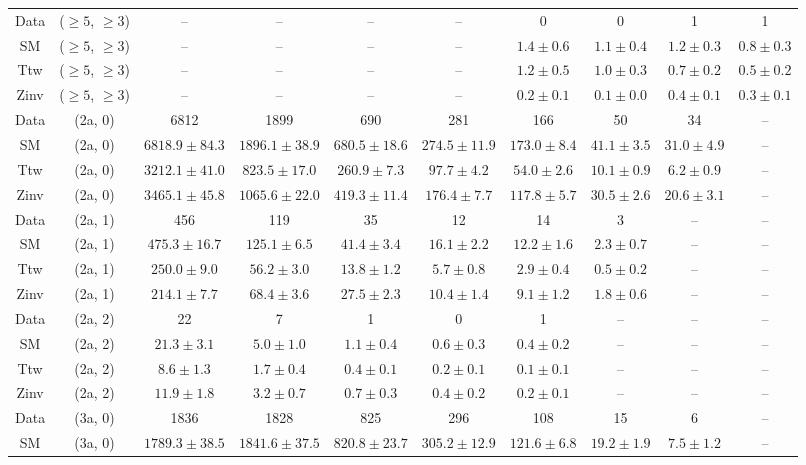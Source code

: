 \begin{table}[h!]
{\begin{tabular}{cccccccccc}
	Data & ($\ge5$, $\ge3$) & -- & -- & -- & -- & 0 & 0 & 1 & 1 \\[0.5ex] 
	SM & ($\ge5$, $\ge3$) & -- & -- & -- & -- & $1.4\pm 0.6$ & $1.1\pm 0.4$ & $1.2\pm 0.3$ & $0.8\pm 0.3$ \\[0.5ex] 
	Ttw & ($\ge5$, $\ge3$) & -- & -- & -- & -- & $1.2\pm 0.5$ & $1.0\pm 0.3$ & $0.7\pm 0.2$ & $0.5\pm 0.2$ \\[0.5ex] 
	Zinv & ($\ge5$, $\ge3$) & -- & -- & -- & -- & $0.2\pm 0.1$ & $0.1\pm 0.0$ & $0.4\pm 0.1$ & $0.3\pm 0.1$ \\[0.5ex] 
	Data & (2a, 0) & 6812 & 1899 & 690 & 281 & 166 & 50 & 34 & -- \\[0.5ex] 
	SM & (2a, 0) & $6818.9\pm 84.3$ & $1896.1\pm 38.9$ & $680.5\pm 18.6$ & $274.5\pm 11.9$ & $173.0\pm 8.4$ & $41.1\pm 3.5$ & $31.0\pm 4.9$ & -- \\[0.5ex] 
	Ttw & (2a, 0) & $3212.1\pm 41.0$ & $823.5\pm 17.0$ & $260.9\pm 7.3$ & $97.7\pm 4.2$ & $54.0\pm 2.6$ & $10.1\pm 0.9$ & $6.2\pm 0.9$ & -- \\[0.5ex] 
	Zinv & (2a, 0) & $3465.1\pm 45.8$ & $1065.6\pm 22.0$ & $419.3\pm 11.4$ & $176.4\pm 7.7$ & $117.8\pm 5.7$ & $30.5\pm 2.6$ & $20.6\pm 3.1$ & -- \\[0.5ex] 
	Data & (2a, 1) & 456 & 119 & 35 & 12 & 14 & 3 & -- & -- \\[0.5ex] 
	SM & (2a, 1) & $475.3\pm 16.7$ & $125.1\pm 6.5$ & $41.4\pm 3.4$ & $16.1\pm 2.2$ & $12.2\pm 1.6$ & $2.3\pm 0.7$ & -- & -- \\[0.5ex] 
	Ttw & (2a, 1) & $250.0\pm 9.0$ & $56.2\pm 3.0$ & $13.8\pm 1.2$ & $5.7\pm 0.8$ & $2.9\pm 0.4$ & $0.5\pm 0.2$ & -- & -- \\[0.5ex] 
	Zinv & (2a, 1) & $214.1\pm 7.7$ & $68.4\pm 3.6$ & $27.5\pm 2.3$ & $10.4\pm 1.4$ & $9.1\pm 1.2$ & $1.8\pm 0.6$ & -- & -- \\[0.5ex] 
	Data & (2a, 2) & 22 & 7 & 1 & 0 & 1 & -- & -- & -- \\[0.5ex] 
	SM & (2a, 2) & $21.3\pm 3.1$ & $5.0\pm 1.0$ & $1.1\pm 0.4$ & $0.6\pm 0.3$ & $0.4\pm 0.2$ & -- & -- & -- \\[0.5ex] 
	Ttw & (2a, 2) & $8.6\pm 1.3$ & $1.7\pm 0.4$ & $0.4\pm 0.1$ & $0.2\pm 0.1$ & $0.1\pm 0.1$ & -- & -- & -- \\[0.5ex] 
	Zinv & (2a, 2) & $11.9\pm 1.8$ & $3.2\pm 0.7$ & $0.7\pm 0.3$ & $0.4\pm 0.2$ & $0.2\pm 0.1$ & -- & -- & -- \\[0.5ex] 
	Data & (3a, 0) & 1836 & 1828 & 825 & 296 & 108 & 15 & 6 & -- \\[0.5ex] 
	SM & (3a, 0) & $1789.3\pm 38.5$ & $1841.6\pm 37.5$ & $820.8\pm 23.7$ & $305.2\pm 12.9$ & $121.6\pm 6.8$ & $19.2\pm 1.9$ & $7.5\pm 1.2$ & -- \\[0.5ex] 

\end{tabular}}
\end{table}
